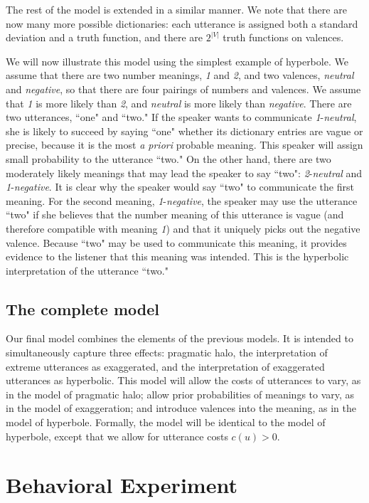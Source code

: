 \documentclass{article} %
\begin{document}
The rest of the model is extended in a similar manner. We note that there are now many more possible dictionaries: each utterance is assigned both a standard deviation and a truth function, and there are $2^{|V|}$ truth functions on valences. 

We will now illustrate this model using the simplest example of hyperbole. We assume that there are two number meanings, \emph{1} and \emph{2}, and two valences, \emph{neutral} and \emph{negative}, so that there are four pairings of numbers and valences. We assume that \emph{1} is more likely than \emph{2}, and \emph{neutral} is more likely than \emph{negative}. There are two utterances, ``one" and ``two." If the speaker wants to communicate \emph{1}-\emph{neutral}, she is likely to succeed by saying ``one" whether its dictionary entries are vague or precise, because it is the most \emph{a priori} probable meaning. This speaker will assign small probability to the utterance ``two." On the other hand, there are two moderately likely meanings that may lead the speaker to say ``two": \emph{2}-\emph{neutral} and \emph{1}-\emph{negative}. It is clear why the speaker would say ``two" to communicate the first meaning. For the second meaning, \emph{1}-\emph{negative}, the speaker may use the utterance ``two" if she believes that the number meaning of this utterance is vague (and therefore compatible with meaning \emph{1}) and that it uniquely picks out the negative valence. Because ``two" may be used to communicate this meaning, it provides evidence to the listener that this meaning was intended. This is the hyperbolic interpretation of the utterance ``two." 

\subsection{The complete model}

Our final model combines the elements of the previous models. It is intended to simultaneously capture three effects: pragmatic halo, the interpretation of extreme utterances as exaggerated, and the interpretation of exaggerated utterances as hyperbolic. This model will allow the costs of utterances to vary, as in the model of pragmatic halo; allow prior probabilities of meanings to vary, as in the model of exaggeration; and introduce valences into the meaning, as in the model of hyperbole. Formally, the model will be identical to the model of hyperbole, except that we allow for utterance costs $c(u) > 0$. 

\section{Behavioral Experiment}
\end{document}
